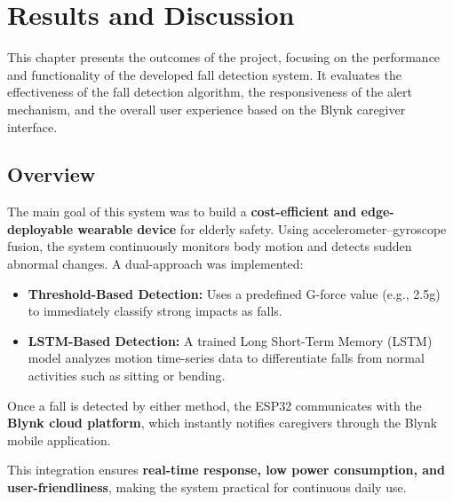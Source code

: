 \documentclass[a4paper, 12pt]{report}
\begin{document}
\chapter{Results and Discussion}

This chapter presents the outcomes of the project, focusing on the performance and functionality of the developed fall detection system. It evaluates the effectiveness of the fall detection algorithm, the responsiveness of the alert mechanism, and the overall user experience based on the Blynk caregiver interface.

\section{Overview}
The main goal of this system was to build a \textbf{cost-efficient and edge-deployable wearable device} for elderly safety. Using accelerometer–gyroscope fusion, the system continuously monitors body motion and detects sudden abnormal changes. A dual-approach was implemented:
\begin{itemize}[itemsep=-4pt]
    \item \textbf{Threshold-Based Detection:} Uses a predefined G-force value (e.g., 2.5g) to immediately classify strong impacts as falls.  
    \item \textbf{LSTM-Based Detection:} A trained Long Short-Term Memory (LSTM) model analyzes motion time-series data to differentiate falls from normal activities such as sitting or bending.  
\end{itemize}
Once a fall is detected by either method, the ESP32 communicates with the \textbf{Blynk cloud platform}, which instantly notifies caregivers through the Blynk mobile application.  

This integration ensures \textbf{real-time response, low power consumption, and user-friendliness}, making the system practical for continuous daily use.
\end{document}
